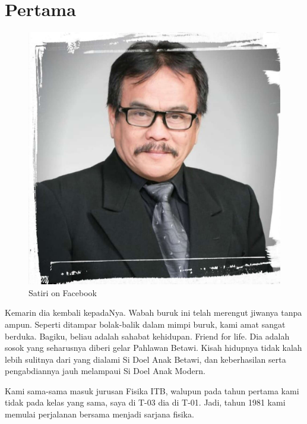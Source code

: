 
\chapter{Pertama}

\begin{figure}[htbp]
\centerline{\includegraphics[scale=1.7]{01-01-01}}
\caption{Satiri on Facebook}
\label{01-01-01}
\end{figure}
%

\noindent
Kemarin dia kembali kepadaNya. Wabah buruk ini telah merengut jiwanya tanpa ampun. Seperti ditampar bolak-balik dalam mimpi buruk, kami amat sangat berduka. Bagiku, beliau adalah sahabat kehidupan. Friend for life. Dia adalah sosok yang seharusnya diberi gelar Pahlawan Betawi. Kisah hidupnya tidak kalah lebih sulitnya dari yang dialami Si Doel Anak Betawi, dan keberhasilan serta pengabdiannya jauh melampaui Si Doel Anak Modern.

Kami sama-sama masuk jurusan Fisika ITB, walupun pada tahun pertama kami tidak pada kelas yang sama, saya di T-03 dia di T-01. Jadi, tahun 1981 kami memulai perjalanan bersama menjadi sarjana fisika.

